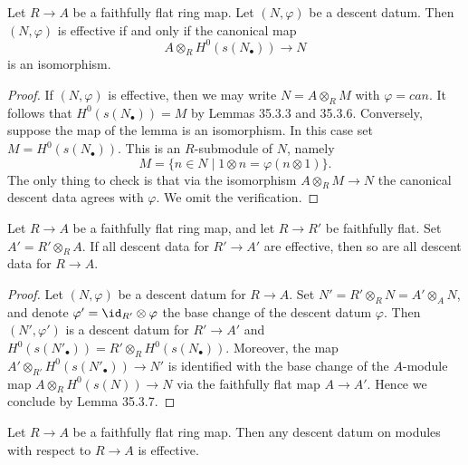 \begin{lemma}[35.3.7, Tag 039W]
Let $R\to A$ be a faithfully flat ring map. Let $(N,\varphi)$ be a descent datum. Then $(N,\varphi)$ is effective if and only if the canonical map
\[
A\otimes_R H^0(s(N_\bullet))\longrightarrow N
\]
is an isomorphism.
\end{lemma}
\begin{proof}
If $(N,\varphi)$ is effective, then we may write $N=A\otimes_R M$ with $\varphi=can$. It follows that $H^0(s(N_\bullet))=M$ by Lemmas 35.3.3 and 35.3.6. Conversely, suppose the map of the lemma is an isomorphism. In this case set $M=H^0(s(N_\bullet))$. This is an $R$-submodule of $N$, namely
\[
M=\{n\in N\mid1\otimes n=\varphi(n\otimes1)\}.
\]
The only thing to check is that via the isomorphism $A\otimes_R M\to N$ the canonical descent data agrees with $\varphi$. We omit the verification.
\end{proof}
\begin{lemma}[35.3.8, Tag 039X]
Let $R\to A$ be a faithfully flat ring map, and let $R\to R'$ be faithfully flat. Set $A'=R'\otimes_R A$. If all descent data for $R'\to A'$ are effective, then so are all descent data for $R\to A$.
\end{lemma}
\begin{proof}
Let $(N,\varphi)$ be a descent datum for $R\to A$. Set $N'=R'\otimes_R N=A'\otimes_A N$, and denote $\varphi'=\id_{R'}\otimes\varphi$ the base change of the descent datum $\varphi$. Then $(N',\varphi')$ is a descent datum for $R'\to A'$ and $H^0(s(N'_\bullet))=R'\otimes_R H^0(s(N_\bullet))$. Moreover, the map $A'\otimes_{R'}H^0(s(N'_\bullet))\to N'$ is identified with the base change of the $A$-module map $A\otimes_R H^0(s(N))\to N$ via the faithfully flat map $A\to A'$. Hence we conclude by Lemma 35.3.7.
\end{proof}
\begin{proposition}
Let $R\to A$ be a faithfully flat ring map. Then any descent datum on modules with respect to $R\to A$ is effective.
\end{proposition}
